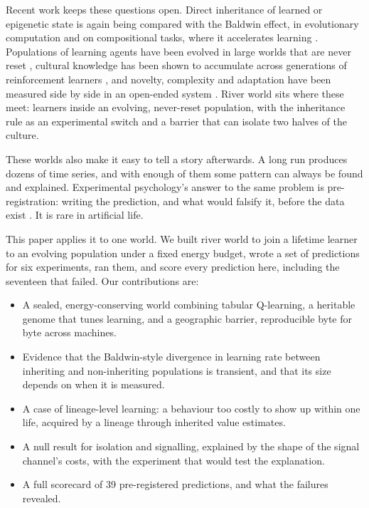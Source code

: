 \documentclass[letterpaper]{article}
\begin{document}
Recent work keeps these questions open. Direct inheritance of learned or epigenetic state is again
being compared with the Baldwin effect, in evolutionary computation \citep{benito2026} and on
compositional tasks, where it accelerates learning \citep{le2026}. Populations of learning agents
have been evolved in large worlds that are never reset \citep{hamon2023}, cultural knowledge has been
shown to accumulate across generations of reinforcement learners \citep{cook2024}, and novelty,
complexity and adaptation have been measured side by side in an open-ended system \citep{moreno2024}.
River world sits where these meet: learners inside an evolving, never-reset population, with the
inheritance rule as an experimental switch and a barrier that can isolate two halves of the culture.

These worlds also make it easy to tell a story afterwards. A long run produces dozens of time series,
and with enough of them some pattern can always be found and explained. Experimental psychology's
answer to the same problem is pre-registration: writing the prediction, and what would falsify it,
before the data exist \citep{nosek2018}. It is rare in artificial life.

This paper applies it to one world. We built river world to join a lifetime learner to an evolving
population under a fixed energy budget, wrote a set of predictions for six experiments, ran them,
and score every prediction here, including the seventeen that failed. Our contributions are:

\begin{itemize}
\setlength\itemsep{0pt}
\item A sealed, energy-conserving world combining tabular Q-learning, a heritable genome that tunes
  learning, and a geographic barrier, reproducible byte for byte across machines.
\item Evidence that the Baldwin-style divergence in learning rate between inheriting and
  non-inheriting populations is transient, and that its size depends on when it is measured.
\item A case of lineage-level learning: a behaviour too costly to show up within one life, acquired
  by a lineage through inherited value estimates.
\item A null result for isolation and signalling, explained by the shape of the signal channel's
  costs, with the experiment that would test the explanation.
\item A full scorecard of 39 pre-registered predictions, and what the failures revealed.
\end{itemize}
\end{document}
